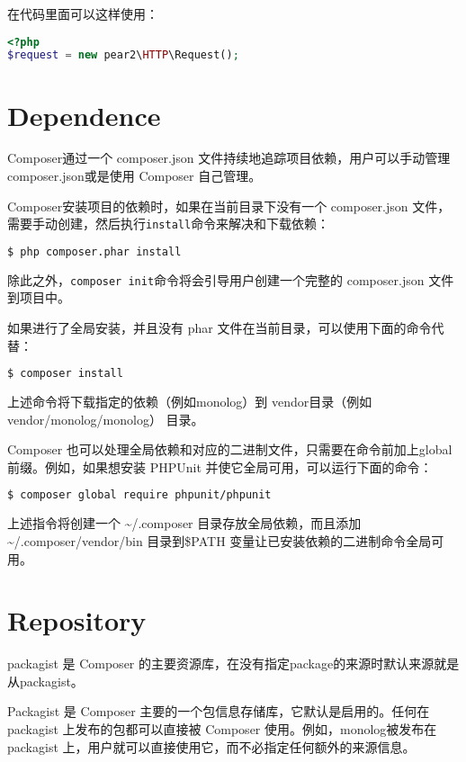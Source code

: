 在代码里面可以这样使用：

\begin{lstlisting}[language=PHP]
<?php
$request = new pear2\HTTP\Request();
\end{lstlisting}


\section{Dependence}

Composer通过一个 composer.json 文件持续地追踪项目依赖，用户可以手动管理composer.json或是使用 Composer 自己管理。

Composer安装项目的依赖时，如果在当前目录下没有一个 composer.json 文件，需要手动创建，然后执行\texttt{install}命令来解决和下载依赖：


\begin{lstlisting}[language=bash]
$ php composer.phar install
\end{lstlisting}

除此之外，\texttt{composer init}命令将会引导用户创建一个完整的 composer.json 文件到项目中。

如果进行了全局安装，并且没有 phar 文件在当前目录，可以使用下面的命令代替：

\begin{lstlisting}[language=bash]
$ composer install
\end{lstlisting}

上述命令将下载指定的依赖（例如monolog）到 vendor目录（例如vendor/monolog/monolog） 目录。

Composer 也可以处理全局依赖和对应的二进制文件，只需要在命令前加上global前缀。例如，如果想安装 PHPUnit 并使它全局可用，可以运行下面的命令：

\begin{lstlisting}[language=bash]
$ composer global require phpunit/phpunit
\end{lstlisting}

上述指令将创建一个 \~{}/.composer 目录存放全局依赖，而且添加\~{}/.composer/vendor/bin 目录到\$PATH 变量让已安装依赖的二进制命令全局可用。


\section{Repository}

packagist 是 Composer 的主要资源库，在没有指定package的来源时默认来源就是从packagist。

Packagist 是 Composer 主要的一个包信息存储库，它默认是启用的。任何在 packagist 上发布的包都可以直接被 Composer 使用。例如，monolog被发布在 packagist 上，用户就可以直接使用它，而不必指定任何额外的来源信息。

